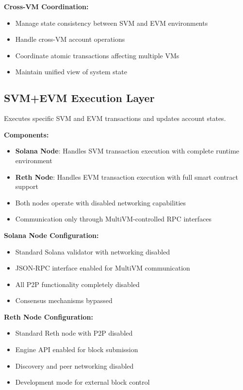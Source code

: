 \documentclass[11pt,a4paper]{article}
\begin{document}
\textbf{Cross-VM Coordination:}
\begin{itemize}
    \item Manage state consistency between SVM and EVM environments
    \item Handle cross-VM account operations
    \item Coordinate atomic transactions affecting multiple VMs
    \item Maintain unified view of system state
\end{itemize}

\subsection{SVM+EVM Execution Layer}
Executes specific SVM and EVM transactions and updates account states.

\textbf{Components:}
\begin{itemize}
    \item \textbf{Solana Node}: Handles SVM transaction execution with complete runtime environment
    \item \textbf{Reth Node}: Handles EVM transaction execution with full smart contract support
    \item Both nodes operate with disabled networking capabilities
    \item Communication only through MultiVM-controlled RPC inter\-faces
\end{itemize}

\textbf{Solana Node Configuration:}
\begin{itemize}
    \item Standard Solana validator with networking disabled
    \item JSON-RPC interface enabled for MultiVM communication
    \item All P2P functionality completely disabled
    \item Consensus mechanisms bypassed
\end{itemize}

\textbf{Reth Node Configuration:}
\begin{itemize}
    \item Standard Reth node with P2P disabled
    \item Engine API enabled for block submission
    \item Discovery and peer networking disabled
    \item Development mode for external block control
\end{itemize}
\end{document}
